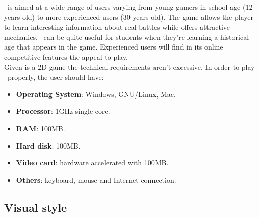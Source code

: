 \game\ is aimed at a wide range of users varying from young gamers
in school age (12 years old) to more experienced users (30 years old).
The game allows the player to learn interesting information about real
battles while offers attractive mechanics. \game\ can be quite useful for
students when they're learning a historical age that appears in the game.
Experienced users will find in its online competitive features the appeal
to play.\\

Given is a 2D game the technical requirements aren't excessive. In order
to play \game\ properly, the user should have:

\begin{itemize}
    \item \textbf{Operating System}: Windows, GNU/Linux, Mac.
    \item \textbf{Processor}: 1GHz single core.
    \item \textbf{RAM}: 100MB.
    \item \textbf{Hard disk}: 100MB.
    \item \textbf{Video card}: hardware accelerated with 100MB.
    \item \textbf{Others}: keyboard, mouse and Internet connection.
\end{itemize}

\subsection{Visual style}
